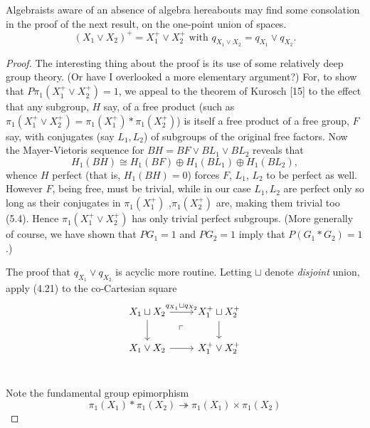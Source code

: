 Algebraists aware of an absence of algebra hereabouts may find some consolation in the proof of the next result, on the one-point union of spaces.
\begin{equation}
	(X_1 \vee X_2)^+ = X_1^+ \vee X_2^+\mbox{ with } q_{X_1\vee X_2}=q_{X_1}\vee q_{X_2}.
\end{equation}
\begin{proof}
 The interesting thing about the proof is its use of some relatively deep group theory. (Or have I overlooked a more elementary argument?) For, to show that $P\pi_1(X_1^+ \vee X_2^+)=1$, we  appeal to the theorem of Kurosch [15] to the effect that any subgroup, $H$ say, of a free product (such as $\pi_1(X_1^+ \vee X_2^+) = \pi_1 (X_1^+)* \pi_1(X_2^+)$) is itself a free product of a free group, $F$ say, with conjugates (say $L_1,L_2$) of subgroups of the original free factors. Now the Mayer-Vietoris sequence for $BH = BF\vee BL_1\vee BL_2$ reveals that
\[H_1(BH)\cong H_1(BF)\oplus H_1(BL_1)\oplus H_1(BL_2),\]
whence $H$ perfect (that is, $H_1(BH) = 0$) forces $F$, $L_1$, $L_2$ to be perfect as well. However $F$, being free, must be trivial, while in our case $L_1, L_2$ are perfect only so long as their conjugates in $\pi_1(X_1^+)$ ,$\pi_1(X_2^+)$ are, making them trivial too (5.4). Hence $\pi_1(X_1^+ \vee X_2^+)$ has only trivial perfect subgroups. (More generally of course, we have shown that $PG_1 = 1$ and $PG_2 = 1$ imply that $P(G_1*G_2)=1$.)

The proof that $q_{X_1}\vee q_{X_2}$ is acyclic more routine. Letting $\sqcup$ denote {\em disjoint} union, apply (4.21) to the co-Cartesian square
\[
 \begin{tikzcd}
 X_1\sqcup X_2 \arrow{r}{q_{X_1}\sqcup q_{X_2} } \arrow{d} \arrow[dr, phantom, "\ulcorner"] & X_1^+\sqcup X_2^+ \arrow{d}\\
 X_1\vee X_2 \arrow{r} & X_1^+\vee X_2^+\\
 \end{tikzcd}
 \]

Note the fundamental group epimorphism
\[\pi_1(X_1) *\pi_1(X_2) \twoheadrightarrow \pi_1(X_1) \times \pi_1(X_2)\]


\end{proof}
